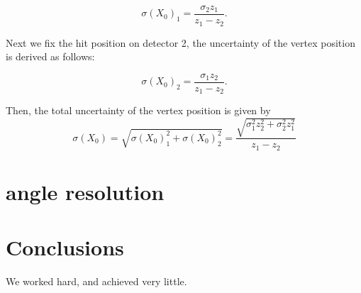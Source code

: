 \documentclass[12pt]{article}
\begin{document}
\[
\sigma(X_0)_1 = \frac{\sigma_2z_1}{z_1 - z_2}.
\]

Next we fix the hit position on detector 2, the uncertainty of the vertex position is derived as follows:

\[
\sigma(X_0)_2 = \frac{\sigma_1z_2}{z_1 - z_2}.
\]

Then, the total uncertainty of the vertex position is given by 
\[
\sigma(X_0) = \sqrt{\sigma(X_0)_1^2+\sigma(X_0)_2^2} = \frac{\sqrt{\sigma_1^2z_2^2+\sigma_2^2z_1^2}} {z_1 - z_2} 
\]

\section{angle resolution}


\section{Conclusions}\label{conclusions}
We worked hard, and achieved very little.

%
%
\end{document}
